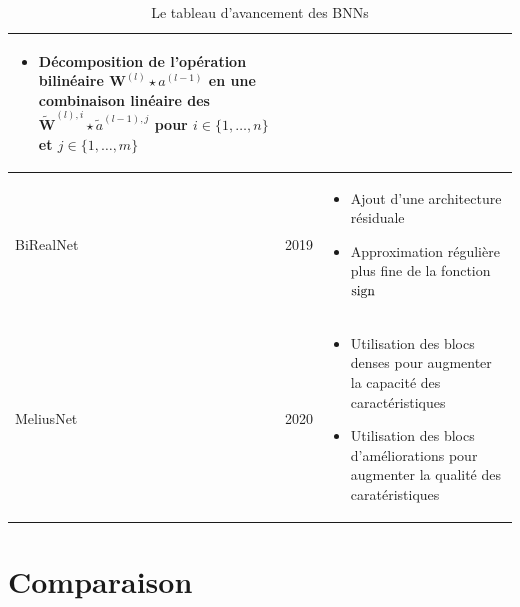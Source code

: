 \begin{table}[h]
\begin{tabularx}{\textwidth}{| p{2.5cm} | p{1cm} | X |}
\begin{itemize}
			\item Décomposition de l'opération bilinéaire $\boldsymbol{W}^{(l)}\star a^{(l-1)}$ en une combinaison linéaire des $\widetilde{\boldsymbol{W}}^{(l),i} \star\tilde{a}^{(l-1),j} $ pour $i\in\{1,\dots,n\}$ et $j\in\{1,\dots,m\}$ 
		\end{itemize}\\
		\hline
		BiRealNet\cite{BiRealNetPaper} & 2019 & \begin{itemize}
			\item Ajout d'une architecture résiduale
			\item Approximation régulière plus fine de la fonction $\operatorname{sign}$
		\end{itemize}\\
		\hline
		MeliusNet & 2020 & \begin{itemize}
			\item Utilisation des blocs denses pour augmenter la capacité des caractéristiques 
			\item Utilisation des blocs d'améliorations pour augmenter la qualité des caratéristiques
		\end{itemize}\\
		\hline 
	\end{tabularx}
	\caption{Le tableau d'avancement des BNNs}
\end{table}
\FloatBarrier
\newpage
\section{Comparaison}
